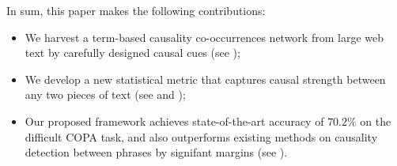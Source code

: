 In sum, this paper makes the following contributions:
\begin{itemize}
\item We harvest a term-based causality co-occurrences network from large
web text by carefully designed causal cues (see );
\item We develop a new statistical metric that captures
causal strength between any two pieces of text (see 
and );


\item Our proposed framework achieves state-of-the-art accuracy of $70.2\%$
on the difficult COPA task, and also outperforms existing methods on
causality detection between phrases by signifant margins (see ).
\end{itemize}

